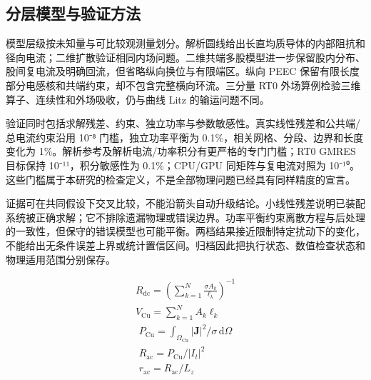 \documentclass[11pt]{article}
\begin{document}
\subsection*{分层模型与验证方法}
\hypertarget{02.hierarchy.heading}{}
模型层级按未知量与可比较观测量划分。解析圆线给出长直均质导体的内部阻抗和径向电流；二维扩散验证相同内场问题。二维共端多股模型进一步保留股内分布、股间复电流及明确回流，但省略纵向换位与有限端区。纵向 PEEC 保留有限长度部分电感核和共端约束，却不包含完整横向环流。三分量 RT0 外场算例检验三维算子、连续性和外场吸收，仍与曲线 Litz 的输运问题不同。


验证同时包括求解残差、约束、独立功率与参数敏感性。真实线性残差和公共端/总电流约束沿用 10⁻⁸ 门槛，独立功率平衡为 0.1\%，相关网格、分段、边界和长度变化为 1\%。解析参考及解析电流/功率积分有更严格的专门门槛；RT0 GMRES 目标保持 10⁻¹¹，积分敏感性为 0.1\%；CPU/GPU 同矩阵与复电流对照为 10⁻¹⁰。这些门槛属于本研究的检查定义，不是全部物理问题已经具有同样精度的宣言。


证据可在共同假设下交叉比较，不能沿箭头自动升级结论。小线性残差说明已装配系统被正确求解；它不排除遗漏物理或错误边界。功率平衡约束离散方程与后处理的一致性，但保守的错误模型也可能平衡。两档结果接近限制特定扰动下的变化，不能给出无条件误差上界或统计置信区间。归档因此把执行状态、数值检查状态和物理适用范围分别保存。


\hypertarget{E01}{}
\begin{equation}
\begin{gathered}
R_{\mathrm{dc}}=\left(\sum_{k=1}^{N}\frac{\sigma A_k}{\ell_k}\right)^{-1} \\
V_{\mathrm{Cu}}=\sum_{k=1}^{N}A_k\ell_k
\end{gathered}
\tag{1}\label{eq:E01}
\end{equation}
\hypertarget{E02}{}
\begin{equation}
\begin{gathered}
P_{\mathrm{Cu}}=\int_{\Omega_{\mathrm{Cu}}}|\mathbf J|^2/\sigma\,\mathrm d\Omega \\
R_{\mathrm{ac}}=P_{\mathrm{Cu}}/|I_t|^2 \\
r_{\mathrm{ac}}=R_{\mathrm{ac}}/L_z
\end{gathered}
\tag{2}\label{eq:E02}
\end{equation}
\end{document}
